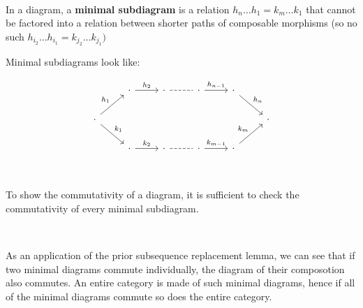 \documentclass{article}
\begin{document}
\begin{definition}
\

In a diagram, a \textbf{minimal subdiagram} is a relation $h_n \dots h_1 = k_m \dots k_1$ that cannot be factored into a relation between shorter paths of composable morphisms (so no such $h_{i_2} \dots h_{i_1} = k_{j_2} \dots k_{j_1})$

Minimal subdiagrams look like:

\[\begin{tikzcd}
& \cdot & \cdot & \cdot & \cdot&\\
\cdot &&&&&\cdot \\
& \cdot & \cdot & \cdot & \cdot&
\arrow[from=2-1,to=1-2, "h_1"]
\arrow[from=1-2,to=1-3, "h_2"]
\arrow[dashed, no head, no tail, from=1-3, to=1-4]
\arrow[from=1-4, to=1-5, "h_{n-1}"]
\arrow[from=1-5, to=2-6, "h_n"]
\arrow[from=2-1,to=3-2, "k_1"]
\arrow[from=3-2,to=3-3, "k_2"]
\arrow[dashed, no head, no tail, from=3-3, to=3-4]
\arrow[from=3-4, to=3-5, "k_{m-1}"]
\arrow[from=3-5, to=2-6, "k_m"]
\end{tikzcd}\]
\end{definition}

\begin{corollary}
\

To show the commutativity of a diagram, it is sufficient to check the commutativity of every minimal subdiagram.
\end{corollary}

\begin{customproof}
\

As an application of the prior subsequence replacement lemma, we can see that if two minimal diagrams commute individually, the diagram of their composotion also commutes. An entire category is made of such minimal diagrams, hence if all of the minimal diagrams commute so does the entire category.
\end{customproof}
\end{document}

